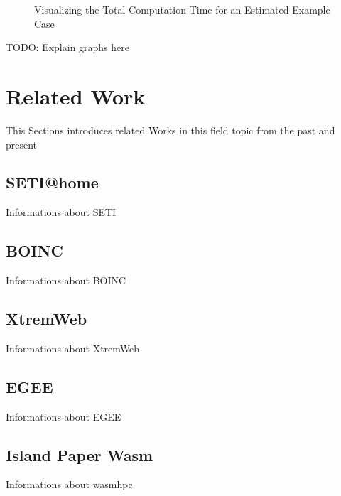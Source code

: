 \begin{figure}[bth]
  \myfloatalign
   \caption{Visualizing the Total Computation Time for an Estimated Example Case}
   \label{fig:background:theoryplot}
\end{figure}

TODO: Explain graphs here

\section{Related Work}
\label{sec:background:related_work}
This Sections introduces related Works in this field topic from the past and present
\subsection{SETI@home}
\label{subsec:background:related_work:seti}
Informations about SETI
\subsection{BOINC}
\label{subsec:background:related_work:boinc}
Informations about BOINC
\subsection{XtremWeb}
\label{subsec:background:related_work:xtremweb}
Informations about XtremWeb
\subsection{EGEE}
\label{subsec:background:related_work:egee}
Informations about EGEE
\subsection{Island Paper Wasm}
\label{subsec:background:related_work:wasmhpc}
Informations about wasmhpc